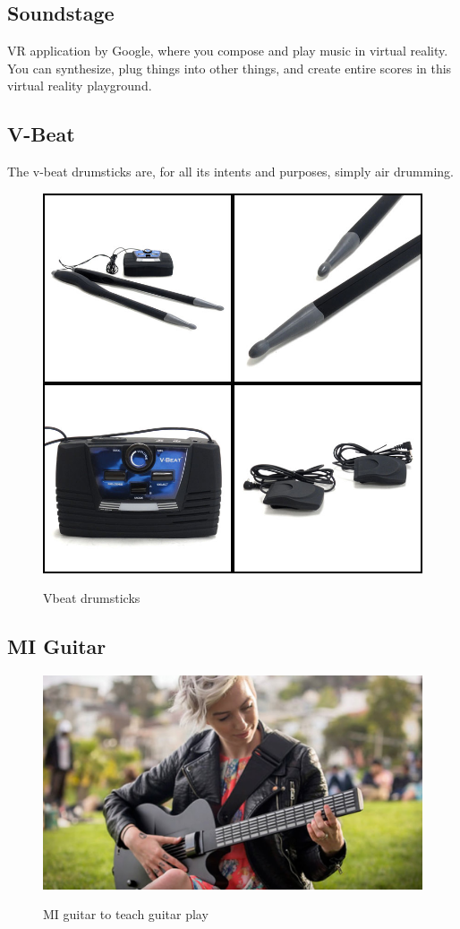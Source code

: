 	\subsection{Soundstage}
		VR application by Google, where you compose and play music in virtual reality. You can synthesize, plug things into other things, and create entire scores in this virtual reality playground.
		
	\subsection{V-Beat}
		The v-beat drumsticks are, for all its intents and purposes, simply air drumming.
		\begin{figure}[H]
			\centering
			\includegraphics[width=0.5\linewidth]{figure/Analysis/vbeat}
			\label{fig:vbeat}
			\caption{Vbeat drumsticks}
		\end{figure}
		
	\subsection{MI Guitar}
		\begin{figure}[H]
			\centering
			\includegraphics[width=0.8\linewidth]{figure/Analysis/miguitar}
			\label{fig:miguitar}
			\caption{MI guitar to teach guitar play}
		\end{figure}
	

